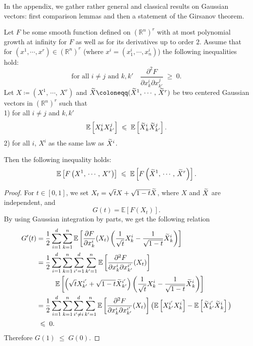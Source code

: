 \documentclass[AHL,Unicode,longabstracts,published]{cedram}
\renewcommand{\tilde}{\widetilde}
\renewcommand{\leq}{\;\leqslant\;}
\renewcommand{\geq}{\;\geqslant\;}
\newcommand{\R}{\mathbb{R}}
\newcommand{\E}{\mathbb{E}}
\newcommand*\green[1]{#1}
\let\oldtilde\tilde
\renewcommand*{\tilde}[1]{\mathchoice{\widetilde{#1}}{\widetilde{#1}}{\oldtilde{#1}}{\oldtilde{#1}}}
\begin{document}
In the appendix, we gather rather general and classical results on Gaussian vectors: first comparison lemmas and then a statement of the Girsanov theorem.

\begin{lemm}\label{kah2}
Let $F$ be some smooth function defined on $(\R^n)^{\green r}$ with at most polynomial growth at infinity for $F$ as well as for its derivatives up to order $2$. Assume that for $(x^1, \cdots, x^{\green r}) \in (\R^n)^{\green r}$ (where $x^i= (x^i_1, \cdots, x^i_n)$) the following inequalities hold:
\begin{equation*}
\text{for all $i \not = j$ and $k,k'$}\quad \frac{\partial^2 F}{\partial x^i_k \partial x^j_{k'} } \geq 0.
\end{equation*}
Let $X\coloneqq (X^1,\,\cdots,\, X^{\green r})$ and $\tilde X\coloneqq (\tilde{X}^1,\, \cdots,\, \tilde{X}^{\green r})$ be two centered Gaussian vectors in $(\R^n)^{\green r}$ such that \\
1) for all $i \not = j$ and $k,k'$
\begin{equation*}
\E\left[X^i_k X^j_{k'}\right] \leq \E\left[\tilde{X}^i_k\tilde{X}^j_{k'}\right].
\end{equation*}
2) for all $i $, $X^i$ as the same law as $\tilde{X}^i$.

Then the following inequality holds:
\begin{equation*}
\E\left[F\left(X^1,\,\cdots,\, X^{r}\right)\right] \leq \E\left[F\left(\tilde{X}^1,\, \cdots,\, \tilde{X}^{r}\right)\right].
\end{equation*}
\end{lemm}


\begin{proof} 
For $t\in [0,1]$, we set $X_t= \sqrt{t} X+\sqrt{1-t} \tilde{X}$, where $X$ and $\tilde{X}$ are independent, and
\begin{equation*}
G(t)= \E[F(X_t)].
\end{equation*}
By using Gaussian integration by parts, we get the following relation
\begin{align*}
G'(t)
& = \frac{1}{2} \sum_{i=1}^d \sum_{k=1}^n \E \left[\frac{\partial F} {\partial x^i_k } (X_t) \left(\frac{1}{\sqrt t} X^i_k - \frac{1}{\sqrt {1-t}} \tilde{X}^i_k\right) \right] \\
& = \frac{1}{2} \sum_{i=1}^d \sum_{k=1}^n \sum_{i'=1}^d \sum_{k'=1}^n \E \left [\frac{\partial^2 F} {\partial x^i_k \partial x^{i'}_{k'} } (X_t) \right]\\
&\mkern50mu\E \left [\left(\sqrt t X^{i'}_{k'} +\sqrt {1-t} \tilde{X}^{i'}_{k'}\right) \left(\frac{1}{\sqrt t} X^i_k - \frac{1}{\sqrt {1-t}} \tilde{X}^i_k\right) \right] \\
& = \frac{1}{2} \sum_{i=1}^d \sum_{k=1}^n \sum_{i' \not =i}^d \sum_{k'=1}^n \E \left [\frac{\partial^2 F} {\partial x^i_k \partial x^{i'}_{k'} } (X_t) \right] \big(\E \left[X^{i'}_{k'} X^i_k\right] -\E \left[\tilde{X}^{i'}_{k'} \tilde{X}^i_k\right] \big) \\
& \leq 0.
\end{align*}
Therefore $G(1)\leq G(0)$.
\end{proof}
\end{document}
